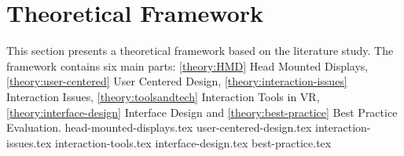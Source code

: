 \chapter{Theoretical Framework}
\label{theory}
This section presents a theoretical framework based on the literature study. The framework contains six main parts: \ref{theory:HMD} Head Mounted Displays, \ref{theory:user-centered} User Centered Design, \ref{theory:interaction-issues} Interaction Issues, \ref{theory:toolsandtech} Interaction Tools in VR, \ref{theory:interface-design} Interface Design and \ref{theory:best-practice} Best Practice Evaluation.
{head-mounted-displays.tex}
{user-centered-design.tex}
{interaction-issues.tex}
{interaction-tools.tex}
{interface-design.tex}
{best-practice.tex}
